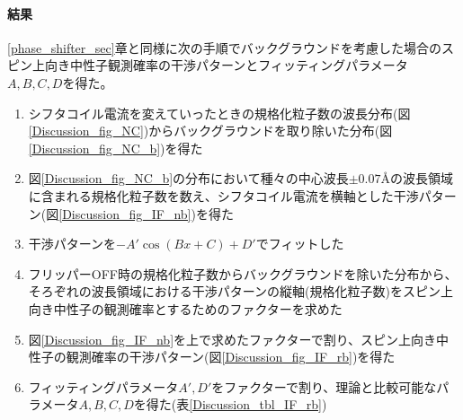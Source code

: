 \paragraph{結果}
\ref{phase_shifter_sec}章と同様に次の手順でバックグラウンドを考慮した場合のスピン上向き中性子観測確率の干渉パターンとフィッティングパラメータ$A, B, C, D$を得た。
\begin{enumerate}
\item シフタコイル電流を変えていったときの規格化粒子数の波長分布(図\ref{Discussion_fig_NC})からバックグラウンドを取り除いた分布(図\ref{Discussion_fig_NC_b})を得た
\item 図\ref{Discussion_fig_NC_b}の分布において種々の中心波長$\pm0.07$\AA の波長領域に含まれる規格化粒子数を数え、シフタコイル電流を横軸とした干渉パターン(図\ref{Discussion_fig_IF_nb})を得た
\item 干渉パターンを$-A'\cos(Bx+C)+D'$でフィットした
\item フリッパーOFF時の規格化粒子数からバックグラウンドを除いた分布から、そろぞれの波長領域における干渉パターンの縦軸(規格化粒子数)をスピン上向き中性子の観測確率とするためのファクターを求めた
\item 図\ref{Discussion_fig_IF_nb}を上で求めたファクターで割り、スピン上向き中性子の観測確率の干渉パターン(図\ref{Discussion_fig_IF_rb})を得た
\item フィッティングパラメータ$A', D'$をファクターで割り、理論と比較可能なパラメータ$A, B, C, D$を得た(表\ref{Discussion_tbl_IF_rb})
\end{enumerate}

